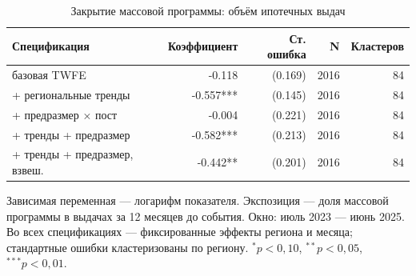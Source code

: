 \begin{table}[htbp]
\centering
\small
\caption{Закрытие массовой программы: объём ипотечных выдач}
\label{tab:specs_volume}
\begin{tabular}{lrrrr}
\toprule
Спецификация & Коэффициент & Ст. ошибка & N & Кластеров \\
\midrule
базовая TWFE & -0.118 & (0.169) & 2016 & 84 \\
+ региональные тренды & -0.557*** & (0.145) & 2016 & 84 \\
+ предразмер × пост & -0.004 & (0.221) & 2016 & 84 \\
+ тренды + предразмер & -0.582*** & (0.213) & 2016 & 84 \\
+ тренды + предразмер, взвеш. & -0.442** & (0.201) & 2016 & 84 \\
\bottomrule
\end{tabular}
\par\smallskip\begin{minipage}{0.92\textwidth}\footnotesize
Зависимая переменная — логарифм показателя. Экспозиция — доля массовой программы в выдачах за 12 месяцев до события. Окно: июль 2023 — июнь 2025. Во всех спецификациях — фиксированные эффекты региона и месяца; стандартные ошибки кластеризованы по региону. $^{*}p<0{,}10$, $^{**}p<0{,}05$, $^{***}p<0{,}01$.
\end{minipage}
\end{table}

